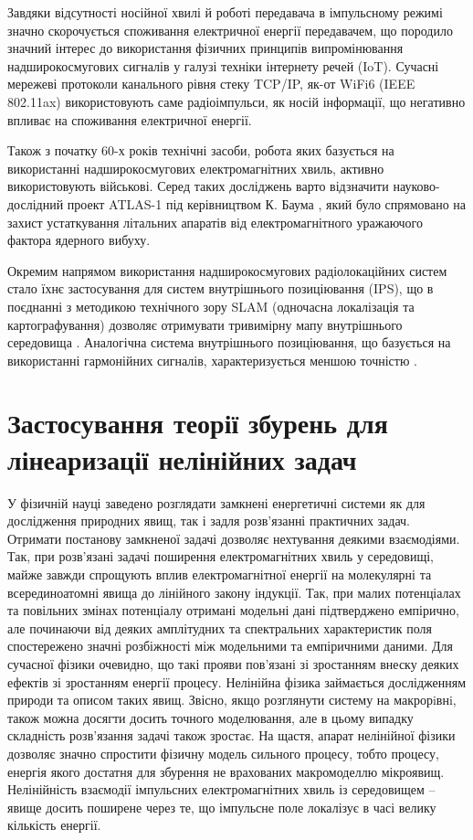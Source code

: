 Завдяки відсутності носійної хвилі й роботі передавача в імпульсному режимі 
значно скорочується споживання електричної енергії передавачем, що породило 
значний інтерес до використання фізичних принципів випромінювання 
надширокосмугових сигналів у галузі техніки інтернету речей (IoT). 
Сучасні мережеві протоколи канального рівня стеку TCP/IP, як-от WiFi6 
(IEEE 802.11ax) \cite{imp:Khorov2019} використовують саме радіоімпульси,
як носій інформації, що негативно впливає на споживання електричної енергії.

Також з початку 60-х років технічні засоби, робота яких базується на 
використанні надширокосмугових електромагнітних хвиль, активно 
використовують військові. Серед таких досліджень варто відзначити 
науково-дослідний проект ATLAS-1 під керівництвом К. Баума 
\cite{imp:BaumSSN0267}, який було спрямовано на захист устаткування 
літальних апаратів від електромагнітного уражаючого фактора ядерного 
вибуху.

Окремим напрямом використання надширокосмугових радіолокаційних систем 
стало їхнє застосування для систем внутрішнього позиціювання (IPS), що в 
поєднанні з методикою технічного зору SLAM (одночасна локалізація та 
картографування) дозволяє отримувати тривимірну мапу внутрішнього 
середовища \cite{imp:Segura2011}. Аналогічна система внутрішнього 
позиціювання, що базується на використанні гармонійних сигналів, 
характеризується меншою точністю \cite{imp:Zou2017}.

\section{Застосування теорії збурень для лінеаризації нелінійних задач}

У фізичній науці заведено розглядати замкнені енергетичні системи як для 
дослідження природних явищ, так і задля розв'язанні практичних задач. 
Отримати постанову замкненої задачі дозволяє нехтування деякими взаємодіями. 
Так, при розв'язані задачі поширення електромагнітних хвиль у середовищі, 
майже завжди спрощують вплив електромагнітної енергії на молекулярні та
всерединоатомні явища до лінійного закону індукції. Так, при малих потенціалах 
та повільних змінах потенціалу отримані модельні дані підтверджено 
емпірично, але починаючи від деяких амплітудних та спектральних характеристик 
поля спостережено значні розбіжності між модельними та емпіричними 
даними. Для сучасної фізики очевидно, що такі прояви пов'язані зі 
зростанням внеску деяких ефектів зі зростанням енергії процесу. Нелінійна 
фізика займається дослідженням природи та описом таких явищ. Звісно, 
якщо розглянути систему на макрорiвнi, також можна досягти досить точного 
моделювання, але в цьому випадку складність розв'язання задачі також 
зростає. На щастя, апарат нелінійної фізики дозволяє значно спростити 
фізичну модель сильного процесу, тобто процесу, енергія якого достатня 
для збурення не врахованих макромоделлю мікроявищ. Нелінійність взаємодії
імпульсних електромагнітних хвиль із середовищем -- явище досить 
поширене через те, що імпульсне поле локалізує в часі велику кількість 
енергії.

